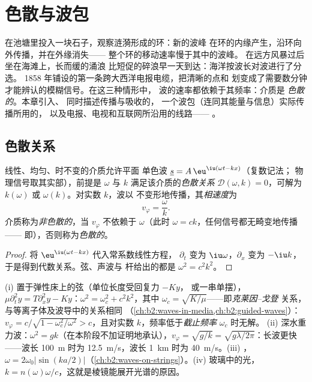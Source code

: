 \chapter{色散与波包}\label{ch:b2:dispersion-wave-packets}

在池塘里投入一块石子，观察涟漪形成的环：新的波峰
在环的内缘产生，沿环向外传播，并在外缘消失——
整个环的移动速率慢于其中的波峰。
在远方风暴过后坐在海滩上，长而缓的涌浪
比短促的碎浪早一天到达：海洋按波长对波进行了分选。
1858 年铺设的第一条跨大西洋电报电缆，把清晰的点和
划变成了需要数分钟才能辨认的模糊信号。在这三种情形中，
波的速率都依赖于其频率：介质是
\emph{色散的}。本章引入、
同时描述传播与吸收的，
一个波包（连同其能量与信息）实际传播所用的，
以及电报、电视和互联网所沿用的线路——
。

\section{色散关系}

\begin{definition}\label{def:b2:dispersion-wave-packets:relation}
线性、均匀、时不变的介质允许平面
单色波 $\underline s = A\,\eu^{\iu(\omega t - kx)}$（复数记法；
物理信号取其实部），前提是 $\omega$ 与 $k$
满足该介质的\emph{色散关系} $\mathcal D(\omega, k)
= 0$，可解为 $k(\omega)$ 或 $\omega(k)$。对实数 $k$，波以
不变形地传播，其\emph{相速度}为
\[
v_\varphi = \frac\omega k .
\]
介质称为\emph{非色散的}，当 $v_\varphi$ 不依赖于
$\omega$（此时 $\omega = ck$，任何信号都无畸变地传播——
即），否则称为\emph{色散的}。
\end{definition}

\begin{proof}
将 $\eu^{\iu(\omega t - kx)}$ 代入常系数线性方程，
$\partial_t$ 变为 $\iu\omega$，$\partial_x$ 变为
$-\iu k$，于是得到代数关系。弦、声波与
杆给出的都是 $\omega^2 = c^2k^2$。
\end{proof}

\begin{example}[色散与非色散]\label{ex:b2:dispersion-wave-packets:examples}
(i) 置于弹性床上的弦（单位长度受回复力 $-Ky$，
或一串单摆），$\mu\partial_t^2y = T\partial_x^2y - Ky$：$\omega^2 = \omega_c^2
+ c^2k^2$，其中 $\omega_c = \sqrt{K/\mu}$——即\emph{克莱因–戈登}
关系，与等离子体及波导中的关系相同
（\cref{ch:b2:waves-in-media,ch:b2:guided-waves}）：$v_\varphi = c/\sqrt{1 -
\omega_c^2/\omega^2} > c$，且对实数 $k$，频率低于\emph{截止频率} $\omega_c$ 时无解。
(ii) 深水重力波：$\omega^2 = gk$（在本阶段不加证明地承认），$v_\varphi =
\sqrt{g/k} = \sqrt{g\lambda/2\pi}$：长波更快——波长 \qty{100}{m} 时为
\qty{12.5}{m/s}，波长 \qty{1}{km} 时为 \qty{40}{m/s}。(iii) ，$\omega =
2\omega_0|\sin(ka/2)|$（\cref{ch:b2:waves-on-strings}）。(iv) 玻璃中的光，
$k = n(\omega)\omega/c$，这就是棱镜能展开光谱的原因。
\end{example}


